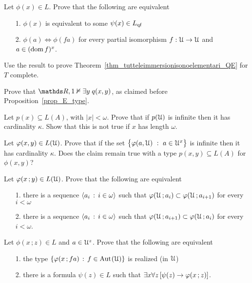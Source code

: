 \begin{exercise}\label{ex_qe_in_U}
  Let $\phi(x)\in L$. Prove that the following are equivalent
  \begin{itemize}
   \item[1.] $\phi(x)$ is equivalent to some $\psi(x)\in L_{\rm qf}$
   \item[2.] $\phi(a)\iff \phi(fa)$ for every partial isomorphism $f:\EuScript U\to\EuScript U$ and $a\in(\mathop{\rm dom} f)^{x}$.
  \end{itemize}
  Use the result to prove Theorem~\ref{thm_tutteleimmersionisonoelementari_QE} for $T$ complete.
  \end{exercise}

\begin{exercise}\label{ex_E_type}
Prove that $\RR,1\notmodels\E y\;q(x,y)$, as claimed before Proposition~\ref{prop_E_type}.
\end{exercise}

\begin{exercise}\label{cadinalitafinitasaturazione}
Let $p(x)\subseteq L(A)$, with $|x|<\omega$. 
Prove that if $p(\EuScript U)$ is infinite then it has cardinality $\kappa$. 
Show that this is not true if $x$ has length $\omega$. 
\end{exercise}

\begin{exercise}\label{cadinalitafinitasaturazioneinsiemi}
Let $\varphi(x,y)\in L(\EuScript U)$. Prove that if the set $\big\{\varphi(a,\EuScript U)\ :\ a\in\EuScript U^{x}\big\}$ is infinite then it has cardinality $\kappa$.
Does the claim remain true with a type $p(x,y)\subseteq L(A)$ for $\phi(x,y)$? 
\end{exercise}

\begin{exercise}\label{ex_saturazione_catene_insiemi}
Let $\varphi(x\,;y)\in L(\EuScript U)$. Prove that the following are equivalent
\begin{itemize}
\item[1.] there is a sequence $\langle a_i\,:\,i\in\omega\rangle$ such that $\varphi(\EuScript U\,;a_i)\subset\varphi(\EuScript U\,;a_{i+1})$ for every $i<\omega$
\item[2.] there is a sequence $\langle a_i\,:\,i\in\omega\rangle$ such that $\varphi(\EuScript U\,;a_{i+1})\subset\varphi(\EuScript U\,;a_i)$ for every $i<\omega$.
\end{itemize}
\end{exercise}

\begin{exercise}\label{ex_ak_definibilita}
  Let $\phi(x\,;z)\in L$ and $a\in\EuScript U^z$.
  Prove that the following are equivalent
  \begin{itemize}
    \item[1.] the type $\{\varphi(x\,;fa)\,:\,f\in{\rm Aut\kern.15ex}(\EuScript U)\}$ is realized (in $\EuScript U$)
    \item[2.] there is a formula $\psi(z)\in L$ such that $\exists x\forall z\,[\psi(z)\rightarrow\varphi(x\,;z)]$.
  \end{itemize}  
\end{exercise}

